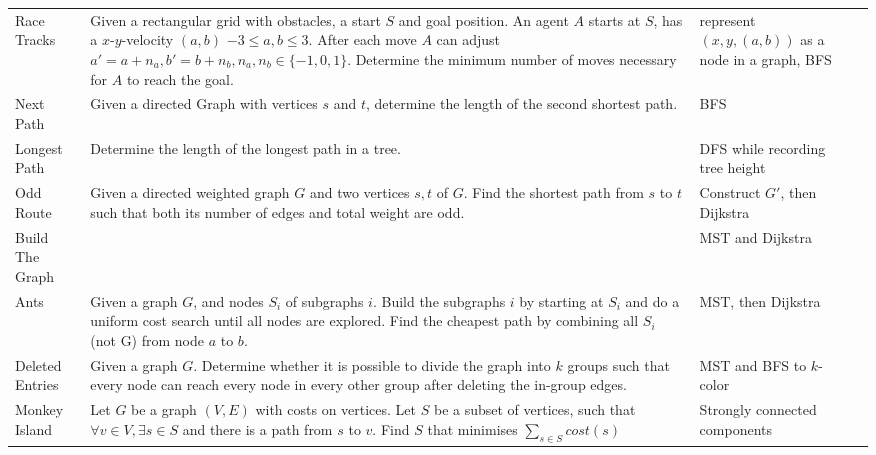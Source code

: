 \documentclass[a4paper, 10pt]{article}
\begin{document}
\begin{longtable}{ L{2cm} L{8cm} L{4cm} r}
        Race Tracks 
        & Given a rectangular grid with obstacles, a start $S$ and goal position. An agent $A$ starts at $S$, has a $x$-$y$-velocity $(a,b)$ 
            $-3\leq a,b \leq3$. After each move $A$ can adjust $a'=a+n_a, b'=b+n_b, n_a,n_b \in \{-1,0,1\}$. 
            Determine the minimum number of moves necessary for $A$ to reach the goal. 
        & represent $(x,y,(a,b))$ as a node in a graph, BFS &  \pageref{sec:race_tracks} \\

        Next Path 
        & Given a directed Graph with vertices $s$ and $t$, determine the length of the second shortest path.
        & BFS &  \pageref{sec:next_path} \\


        Longest Path 
        & Determine the length of the longest path in a tree.
        & DFS while recording tree height &  \pageref{sec:longest_path} \\

        Odd Route
        & Given a directed weighted graph $G$ and two vertices $s,t$ of $G$. Find the shortest path from 
            $s$ to $t$ such that both its number of edges and total weight are odd.
        & Construct $G'$, then Dijkstra &  \pageref{sec:odd_route} \\

        Build The Graph 
        &          
        & MST and Dijkstra &  \pageref{sec:build_the_graph} \\

        Ants 
        & Given a graph $G$, and nodes $S_i$ of subgraphs $i$. 
            Build the subgraphs $i$ by starting at $S_i$ and do a uniform cost search until all nodes are explored.
            Find the cheapest path by combining all $S_i$ (not G) from node $a$ to $b$. 
        & MST, then Dijkstra &  \pageref{sec:ants} \\

        Deleted Entries 
        & Given a graph $G$. Determine whether it is possible to divide the graph into $k$ groups such that every node can reach every node in every other group
            after deleting the in-group edges.
        & MST and BFS to $k$-color &  \pageref{sec:deleted_entries} \\

        Monkey Island 
        & Let $G$ be a graph $(V,E)$ with costs on vertices. Let $S$ be a subset of vertices,
            such that $\forall v\in V,\exists s\in S$ and there is a path from  $s$ to $v$. 
            Find $S$ that minimises $\sum_{s\in S}cost(s)$ 
        & Strongly connected components &  \pageref{sec:monkey_island} \\


\end{longtable}
\end{document}
